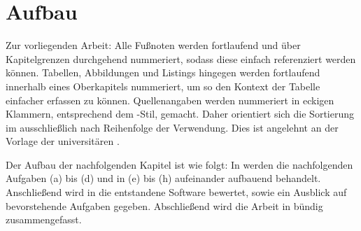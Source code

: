 \section{Aufbau}\label{sec:aufbau}

Zur vorliegenden Arbeit:
Alle Fußnoten werden fortlaufend und über Kapitelgrenzen durchgehend nummeriert, sodass diese einfach referenziert werden können.
Tabellen, Abbildungen und Listings hingegen werden fortlaufend innerhalb eines Oberkapitels nummeriert, um so den Kontext der Tabelle einfacher erfassen zu können.
Quellenangaben werden nummeriert in eckigen Klammern, entsprechend dem -Stil, gemacht.
Daher orientiert sich die Sortierung im \bibTitle{} ausschließlich nach Reihenfolge der Verwendung.
Dies ist angelehnt an der Vorlage der universitären .

Der Aufbau der nachfolgenden Kapitel ist wie folgt:
In  werden die nachfolgenden Aufgaben (a) bis (d) und in  (e) bis (h) aufeinander aufbauend behandelt.
Anschließend wird in  die entstandene Software bewertet, sowie ein Ausblick auf bevorstehende Aufgaben gegeben.
Abschließend wird die Arbeit in  bündig zusammengefasst.

